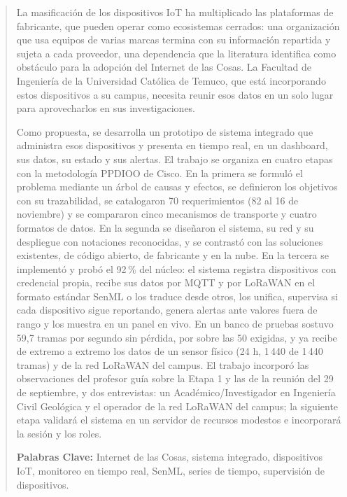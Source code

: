\begin{abstract}
La masificación de los dispositivos IoT ha multiplicado las plataformas de fabricante, que pueden
operar como ecosistemas cerrados: una organización que usa equipos de varias marcas termina con su
información repartida y sujeta a cada proveedor, una dependencia que la literatura identifica como
obstáculo para la adopción del Internet de las Cosas. La Facultad de Ingeniería de la Universidad
Católica de Temuco, que está incorporando estos dispositivos a su campus, necesita reunir esos datos
en un solo lugar para aprovecharlos en sus investigaciones.

Como propuesta, se desarrolla un prototipo de sistema integrado que administra esos dispositivos y
presenta en tiempo real, en un dashboard, sus datos, su estado y sus alertas. El trabajo se organiza
en cuatro etapas con la metodología PPDIOO de Cisco. En la primera se formuló el problema mediante un
árbol de causas y efectos, se definieron los objetivos con su trazabilidad, se catalogaron 70
requerimientos (82 al 16 de noviembre) y se compararon cinco mecanismos de transporte y cuatro formatos de datos. En la
segunda se diseñaron el sistema, su red y su despliegue con notaciones reconocidas, y se contrastó
con las soluciones existentes, de código abierto, de fabricante y en la nube. En la tercera se implementó y probó
el 92\,\% del núcleo: el sistema registra dispositivos con credencial propia, recibe sus datos por MQTT y por
LoRaWAN en el formato estándar SenML o los traduce desde otros, los unifica, supervisa si cada dispositivo sigue
reportando, genera alertas ante valores fuera de rango y los muestra en un panel en vivo. En un banco de pruebas sostuvo 59,7 tramas por segundo sin pérdida, por sobre las 50 exigidas, y ya recibe de extremo a extremo los datos de un sensor físico (24 h, 1\,440 de 1\,440 tramas) y de la red LoRaWAN del campus. El trabajo incorporó las observaciones del profesor guía sobre la Etapa 1 y las de la reunión del 29 de septiembre, y dos entrevistas: un Académico/Investigador en Ingeniería Civil Geológica y el operador de la red LoRaWAN del campus; la siguiente etapa validará el sistema en un servidor de recursos modestos e incorporará la sesión y los roles.

{\bf Palabras Clave:}
Internet de las Cosas, sistema integrado, dispositivos IoT, monitoreo en tiempo real, SenML, series
de tiempo, supervisión de dispositivos.
\end{abstract}
\clearpage
